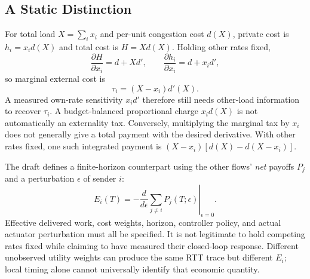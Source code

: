 \documentclass[conference,letterpaper]{IEEEtran}
\begin{document}
\subsection{A Static Distinction}
For total load $X=\sum_i x_i$ and per-unit congestion cost $d(X)$, private cost is $h_i=x_i d(X)$ and total cost is $H=Xd(X)$. Holding other rates fixed,
\begin{equation}
\frac{\partial H}{\partial x_i}=d+Xd',\qquad
\frac{\partial h_i}{\partial x_i}=d+x_i d',
\end{equation}
so marginal external cost is
\begin{equation}
\tau_i=(X-x_i)d'(X).
\end{equation}
A measured own-rate sensitivity $x_i d'$ therefore still needs other-load information to recover $\tau_i$. A budget-balanced proportional charge $x_i d(X)$ is not automatically an externality tax. Conversely, multiplying the marginal tax by $x_i$ does not generally give a total payment with the desired derivative. With other rates fixed, one such integrated payment is $(X-x_i)[d(X)-d(X-x_i)]$.

The draft defines a finite-horizon counterpart using the other flows' \emph{net} payoffs $P_j$ and a perturbation $\epsilon$ of sender $i$:
\begin{equation}
E_i(T)=-\left.\frac{d}{d\epsilon}\sum_{j\ne i}P_j(T;\epsilon)\right|_{\epsilon=0}.
\end{equation}
Effective delivered work, cost weights, horizon, controller policy, and actual actuator perturbation must all be specified. It is not legitimate to hold competing rates fixed while claiming to have measured their closed-loop response. Different unobserved utility weights can produce the same RTT trace but different $E_i$; local timing alone cannot universally identify that economic quantity.
\end{document}
